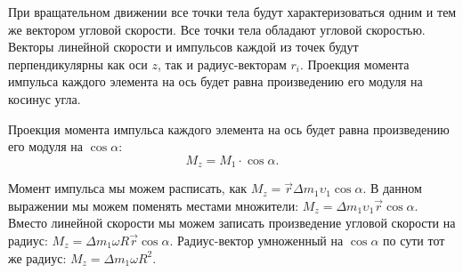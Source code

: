 \begin{figure}[!htbp]
  \begin{center}
  \end{center}
\end{figure}

При вращательном движении все точки тела будут характеризоваться одним и тем же
вектором угловой скорости. Все точки тела обладают угловой скоростью. Векторы
линейной скорости и импульсов каждой из точек будут перпендикулярны как оси
$z$, так и радиус-векторам $r_i$. Проекция момента импульса каждого элемента на
ось будет равна произведению его модуля на косинус угла.

Проекция момента импульса каждого элемента на ось будет равна произведению его
модуля на \( \cos \alpha \): \[
  M_z = M_1 \cdot \cos \alpha
.\]

Момент импульса мы можем расписать, как \( M_z = \vec{r} \Delta m_1 \upsilon_1
\cos \alpha \). В данном выражении мы можем поменять местами множители: \( M_z
= \Delta m_1 \upsilon_1 \vec{r} \cos \alpha \). Вместо линейной скорости мы
можем записать произведение угловой скорости на радиус: \( M_z = \Delta m_1
\omega R \vec{r} \cos \alpha \). Радиус-вектор умноженный на $\cos \alpha$ по
сути тот же радиус: \( M_z = \Delta m_1 \omega R^2 \).

